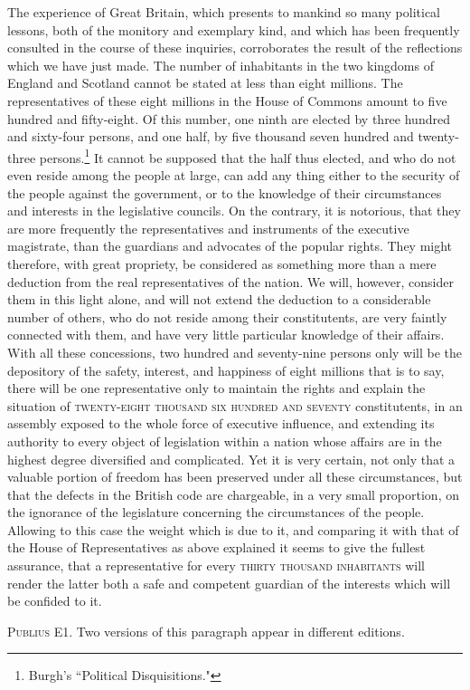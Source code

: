 The experience of Great Britain, which presents to mankind so many political lessons, both of the monitory and exemplary kind, and which has been frequently consulted in the course of these inquiries, corroborates the result of the reflections which we have just made. The number of inhabitants in the two kingdoms of England and Scotland cannot be stated at less than eight millions. The representatives of these eight millions in the House of Commons amount to five hundred and fifty-eight. Of this number, one ninth are elected by three hundred and sixty-four persons, and one half, by five thousand seven hundred and twenty-three persons.\footnote{Burgh's ``Political Disquisitions."} It cannot be supposed that the half thus elected, and who do not even reside among the people at large, can add any thing either to the security of the people against the government, or to the knowledge of their circumstances and interests in the legislative councils. On the contrary, it is notorious, that they are more frequently the representatives and instruments of the executive magistrate, than the guardians and advocates of the popular rights. They might therefore, with great propriety, be considered as something more than a mere deduction from the real representatives of the nation. We will, however, consider them in this light alone, and will not extend the deduction to a considerable number of others, who do not reside among their constitutents, are very faintly connected with them, and have very little particular knowledge of their affairs. With all these concessions, two hundred and seventy-nine persons only will be the depository of the safety, interest, and happiness of eight millions that is to say, there will be one representative only to maintain the rights and explain the situation of \textsc{twenty}-\textsc{eight thousand six hundred and seventy }constitutents, in an assembly exposed to the whole force of executive influence, and extending its authority to every object of legislation within a nation whose affairs are in the highest degree diversified and complicated. Yet it is very certain, not only that a valuable portion of freedom has been preserved under all these circumstances, but that the defects in the British code are chargeable, in a very small proportion, on the ignorance of the legislature concerning the circumstances of the people. Allowing to this case the weight which is due to it, and comparing it with that of the House of Representatives as above explained it seems to give the fullest assurance, that a representative for every \textsc{thirty thousand inhabitants }will render the latter both a safe and competent guardian of the interests which will be confided to it.

\vspace{.5cm}
\textsc{Publius}
E1. Two versions of this paragraph appear in different editions.

